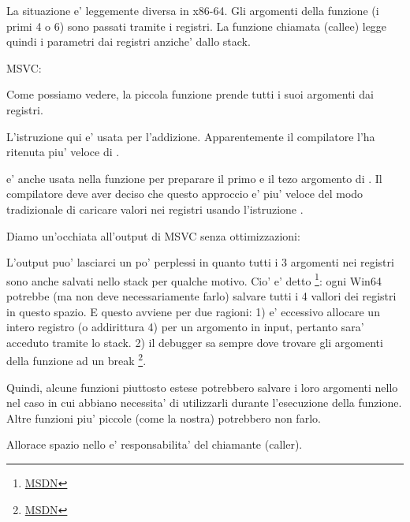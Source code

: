 

La situazione e' leggemente diversa in x86-64. Gli argomenti della funzione (i primi 4 o 6) 
sono passati tramite i registri. La funzione chiamata (\gls{callee}) legge quindi i parametri dai registri anziche' dallo stack.


\Optimizing MSVC:



Come possiamo vedere, la piccola funzione \ttf prende tutti i suoi argomenti dai registri.

L'istruzione \LEA qui e' usata per l'addizione. Apparentemente il compilatore l'ha ritenuta piu' veloce di .

\LEA e' anche usata nella funzione \main per preparare il primo e il tezo argomento di \ttf.
Il compilatore deve aver deciso che questo approccio e' piu' veloce del modo tradizionale di caricare valori nei registri usando l'istruzione \MOV.

Diamo un'occhiata all'output di MSVC senza ottimizzazioni:



L'output puo' lasciarci un po' perplessi in quanto tutti i 3 argomenti nei registri sono anche salvati nello stack per qualche motivo. 
\label{shadow_space}
Cio' e' detto 
\footnote{\href{http://go.yurichev.com/17256}{MSDN}}: 
ogni Win64 potrebbe (ma non deve necessariamente farlo) salvare tutti i 4 vallori dei registri in questo spazio.
E questo avviene per due ragioni: 
1) e' eccessivo allocare un intero registro (o addirittura 4) per un argomento in input, pertanto sara' acceduto tramite lo stack.
2) il debugger sa sempre dove trovare gli argomenti della funzione ad un break
\footnote{\href{http://go.yurichev.com/17257}{MSDN}}.

Quindi, alcune funzioni piuttosto estese potrebbero salvare i loro argomenti nello  nel caso in cui 
abbiano necessita' di utilizzarli durante l'esecuzione della funzione. Altre funzioni piu' piccole (come la nostra) potrebbero non farlo.

Allorace spazio nello  e' responsabilita' del chiamante (\gls{caller}).

